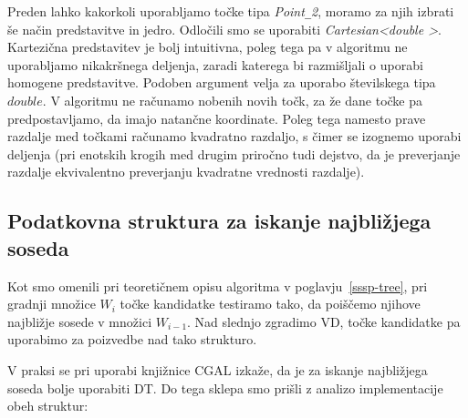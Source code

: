 \documentclass[a4paper, 12pt]{book}
\newcommand{\U}{\texttt{\_}}
\begin{document}
Preden lahko kakorkoli uporabljamo točke tipa \textit{Point\U 2}, moramo za njih izbrati še način predstavitve in jedro. Odločili smo se uporabiti \textit{Cartesian\textless double \textgreater}. Kartezična predstavitev je bolj intuitivna, poleg tega pa v algoritmu ne uporabljamo nikakršnega deljenja, zaradi katerega bi razmišljali o uporabi homogene predstavitve. Podoben argument velja za uporabo številskega tipa $double$. V algoritmu ne računamo nobenih novih točk, za že dane točke pa predpostavljamo, da imajo natančne koordinate. Poleg tega namesto prave razdalje med točkami računamo kvadratno razdaljo, s čimer se izognemo uporabi deljenja (pri enotskih krogih med drugim priročno tudi dejstvo, da je preverjanje razdalje ekvivalentno preverjanju kvadratne vrednosti razdalje).

\subsection{Podatkovna struktura za iskanje najbližjega soseda}
\label{why dt}

Kot smo omenili pri teoretičnem opisu algoritma v poglavju~\ref{sssp-tree}, pri gradnji množice $W_i$ točke kandidatke testiramo tako, da poiščemo njihove najbližje sosede v množici $W_{i-1}$. Nad slednjo zgradimo VD, točke kandidatke pa uporabimo za poizvedbe nad tako strukturo.

V praksi se pri uporabi knjižnice CGAL izkaže, da je za iskanje najbližjega soseda bolje uporabiti DT. Do tega sklepa smo prišli z analizo implementacije obeh struktur:
\end{document}
